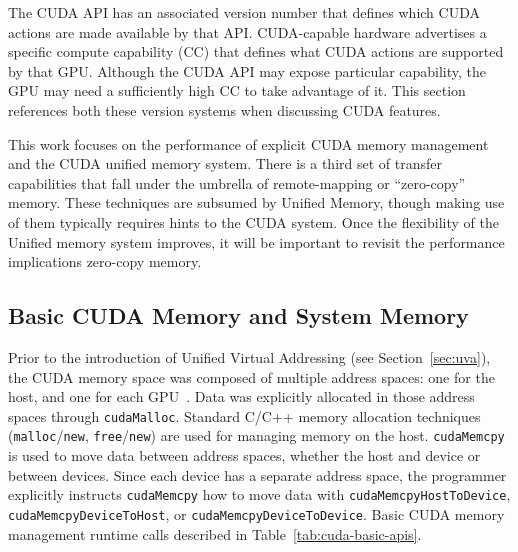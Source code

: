 The CUDA API has an associated version number that defines which CUDA actions are made available by that API.
CUDA-capable hardware advertises a specific compute capability (CC) that defines what CUDA actions are supported by that GPU.
Although the CUDA API may expose particular capability, the GPU may need a sufficiently high CC to take advantage of it.
This section references both these version systems when discussing CUDA features.

This work focuses on the performance of explicit CUDA memory management and the CUDA unified memory system.
There is a third set of transfer capabilities that fall under the umbrella of remote-mapping or ``zero-copy'' memory.
These techniques are subsumed by Unified Memory, though making use of them typically requires hints to the CUDA system.
Once the flexibility of the Unified memory system improves, it will be important to revisit the performance implications zero-copy memory.

\subsection{Basic CUDA Memory and System Memory}
\label{sec:basic-cuda}

Prior to the introduction of Unified Virtual Addressing (see Section~\ref{sec:uva}), the CUDA memory space was composed of multiple address spaces: one for the host, and one for each GPU~\cite{schroeder2011peer}.
Data was explicitly allocated in those address spaces through \texttt{cudaMalloc}.
Standard C/C++ memory allocation techniques (\texttt{malloc}/\texttt{new}, \texttt{free}/\texttt{new}) are used for managing memory on the host.
\texttt{cudaMemcpy} is used to move data between address spaces, whether the host and device or between devices.
Since each device has a separate address space, the programmer explicitly instructs \texttt{cudaMemcpy} how to move data with \texttt{cudaMemcpyHostToDevice}, \texttt{cudaMemcpyDeviceToHost}, or \texttt{cudaMemcpyDeviceToDevice}.
Basic CUDA memory management runtime calls described in Table~\ref{tab:cuda-basic-apis}.

